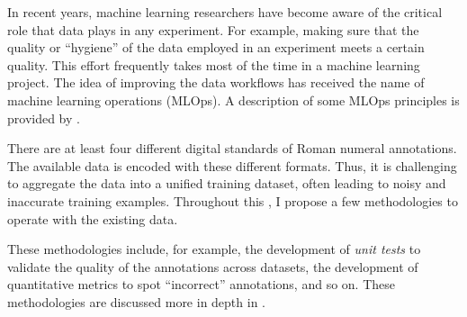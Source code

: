 

In recent years, machine learning researchers have become
aware of the critical role that data plays in any
experiment. For example, making sure that the quality or
``hygiene'' of the data employed in an experiment meets a
certain quality. This effort frequently takes most of the
time in a machine learning project. The idea of improving
the data workflows has received the name of machine learning
operations (MLOps). A description of some MLOps principles
is provided by \textcite{renggli2021data}.

There are at least four different digital standards of Roman
numeral annotations. The available data is encoded with
these different formats. Thus, it is challenging to
aggregate the data into a unified training dataset, often
leading to noisy and inaccurate training examples.
Throughout this \thesisdiss, I propose a few methodologies
to operate with the existing data.

These methodologies include, for example, the development of
\emph{unit tests} to validate the quality of the annotations
across datasets, the development of quantitative metrics to spot ``incorrect'' annotations, and so on. These methodologies are discussed more in depth in .
